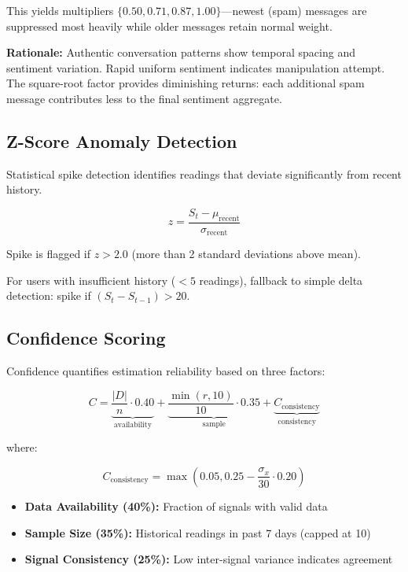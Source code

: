\documentclass[journal]{IEEEtran}
\begin{document}
This yields multipliers $\{0.50, 0.71, 0.87, 1.00\}$—newest (spam) messages are suppressed most heavily while older messages retain normal weight.

\textbf{Rationale:} Authentic conversation patterns show temporal spacing and sentiment variation. Rapid uniform sentiment indicates manipulation attempt. The square-root factor provides diminishing returns: each additional spam message contributes less to the final sentiment aggregate.

\subsection{Z-Score Anomaly Detection}

Statistical spike detection identifies readings that deviate significantly from recent history.

\begin{equation}
z = \frac{S_t - \mu_{\text{recent}}}{\sigma_{\text{recent}}}
\end{equation}

Spike is flagged if $z > 2.0$ (more than 2 standard deviations above mean).

For users with insufficient history ($<5$ readings), fallback to simple delta detection: spike if $(S_t - S_{t-1}) > 20$.

\subsection{Confidence Scoring}

Confidence quantifies estimation reliability based on three factors:

\begin{equation}
C = \underbrace{\frac{|D|}{n} \cdot 0.40}_{\text{availability}} + \underbrace{\frac{\min(r, 10)}{10} \cdot 0.35}_{\text{sample}} + \underbrace{C_{\text{consistency}}}_{\text{consistency}}
\end{equation}

where:

\begin{equation}
C_{\text{consistency}} = \max\left(0.05, 0.25 - \frac{\sigma_x}{30} \cdot 0.20\right)
\end{equation}

\begin{itemize}
    \item \textbf{Data Availability (40\%):} Fraction of signals with valid data
    \item \textbf{Sample Size (35\%):} Historical readings in past 7 days (capped at 10)
    \item \textbf{Signal Consistency (25\%):} Low inter-signal variance indicates agreement
\end{itemize}
\end{document}
